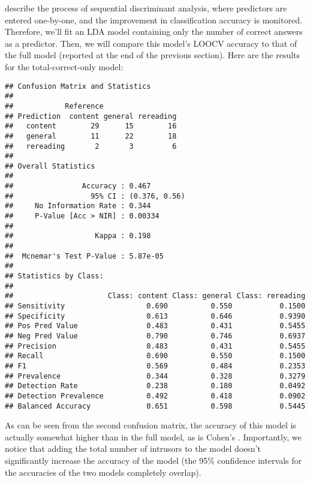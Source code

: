 \documentclass[11pt,]{article}
\begin{document}
\citet{tabachnickUsingMultivariateStatistics2012} describe the process
of sequential discriminant analysis, where predictors are entered
one-by-one, and the improvement in classification accuracy is monitored.
Therefore, we'll fit an LDA model containing only the number of correct
answers as a predictor. Then, we will compare this model's LOOCV
accuracy to that of the full model (reported at the end of the previous
section). Here are the results for the total-correct-only model:

\begin{verbatim}
## Confusion Matrix and Statistics
## 
##            Reference
## Prediction  content general rereading
##   content        29      15        16
##   general        11      22        18
##   rereading       2       3         6
## 
## Overall Statistics
##                                        
##                Accuracy : 0.467        
##                  95% CI : (0.376, 0.56)
##     No Information Rate : 0.344        
##     P-Value [Acc > NIR] : 0.00334      
##                                        
##                   Kappa : 0.198        
##                                        
##  Mcnemar's Test P-Value : 5.87e-05     
## 
## Statistics by Class:
## 
##                      Class: content Class: general Class: rereading
## Sensitivity                   0.690          0.550           0.1500
## Specificity                   0.613          0.646           0.9390
## Pos Pred Value                0.483          0.431           0.5455
## Neg Pred Value                0.790          0.746           0.6937
## Precision                     0.483          0.431           0.5455
## Recall                        0.690          0.550           0.1500
## F1                            0.569          0.484           0.2353
## Prevalence                    0.344          0.328           0.3279
## Detection Rate                0.238          0.180           0.0492
## Detection Prevalence          0.492          0.418           0.0902
## Balanced Accuracy             0.651          0.598           0.5445
\end{verbatim}

As can be seen from the second confusion matrix, the accuracy of this
model is actually somewhat higher than in the full model, as is Cohen's
\textkappa. Importantly, we notice that adding the total number of
intrusors to the model doesn't significantly increase the accuracy of
the model (the 95\% confidence intervals for the accuracies of the two
models completely overlap).
\end{document}
